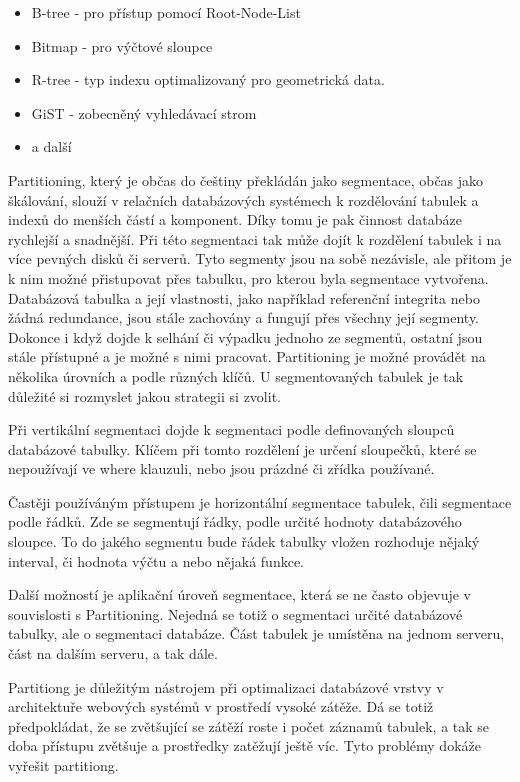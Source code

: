 \documentclass[12pt]{article}
\begin{document}
\begin{itemize}
\item B-tree - pro přístup pomocí Root-Node-List
\item Bitmap - pro výčtové sloupce
\item R-tree - typ indexu optimalizovaný pro geometrická data.
\item GiST - zobecněný vyhledávací strom
\item a další
\end{itemize}


Partitioning, který je občas do češtiny překládán jako segmentace, občas jako škálování, slouží v relačních databázových systémech k rozdělování tabulek a indexů do menších částí a komponent. Díky tomu je pak činnost databáze rychlejší a snadnější. Při této segmentaci tak může dojít k rozdělení tabulek i na více pevných disků či serverů. Tyto segmenty jsou na sobě nezávisle, ale přitom je k nim možné přistupovat přes tabulku, pro kterou byla segmentace vytvořena. Databázová tabulka a její vlastnosti, jako například referenční integrita nebo žádná redundance, jsou stále zachovány a fungují přes všechny její segmenty. Dokonce i když dojde k selhání či výpadku jednoho ze segmentů, ostatní jsou stále přístupné a je možné s nimi pracovat. Partitioning je možné provádět na několika úrovních a podle různých klíčů. U segmentovaných tabulek je tak důležité si rozmyslet jakou strategii si zvolit. 

Při vertikální segmentaci dojde k segmentaci podle definovaných sloupců databázové tabulky. Klíčem při tomto rozdělení je určení sloupečků, které se nepoužívají ve where klauzuli, nebo jsou prázdné či zřídka používané. 

Častěji používáným přístupem je horizontální segmentace tabulek, čili segmentace podle řádků. Zde se segmentují řádky, podle určité hodnoty databázového sloupce. To do jakého segmentu bude řádek tabulky vložen rozhoduje nějaký interval, či hodnota výčtu a nebo nějaká funkce.

Další možností je aplikační úroveň segmentace, která se ne často objevuje v souvislosti s Partitioning. Nejedná se totiž o segmentaci určité databázové tabulky, ale o segmentaci databáze. Část tabulek je umístěna na jednom serveru, část na dalším serveru, a tak dále.

Partitiong je důležitým nástrojem při optimalizaci databázové vrstvy v architektuře webových systémů v prostředí vysoké zátěže. Dá se totiž předpokládat, že se zvětšující se zátěží roste i počet záznamů tabulek, a tak se doba přístupu zvětšuje a prostředky zatěžují ještě víc. Tyto problémy dokáže vyřešit partitiong.
\cite{partitioning-db}
\end{document}
